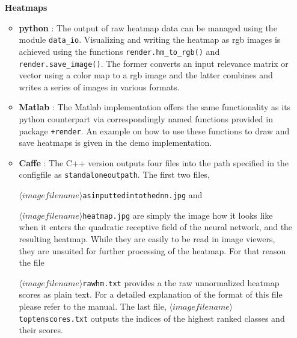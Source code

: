 \documentclass[a4wide]{article}
\begin{document}
\begin{itemize}
\item[{\textbf{Heatmaps}}]
	\begin{itemize}
		\item \textbf{python} : The output of raw heatmap data can be managed using the module \texttt{data\_io}. Visualizing and writing the heatmap as rgb images is achieved using the functions \texttt{render.hm\_to\_rgb()} and \texttt{render.save\_image()}. The former converts an input relevance matrix or vector using a color map to a rgb image and the latter combines and writes a series of images in various formats.
		\item \textbf{Matlab} : The Matlab implementation offers the same functionality as its python counterpart via correspondingly named functions provided in package \texttt{+render}. An example on how to use these functions to draw and save heatmaps is given in the demo implementation.
		\item \textbf{Caffe} : The C++ version outputs four files into the path specified in the configfile as \texttt{standalone\textunderscore outpath}. The first two files, 

\texttt{$\langle imagefilename\rangle$\textunderscore as\textunderscore inputted\textunderscore into\textunderscore the\textunderscore dnn.jpg} and 

\texttt{$\langle imagefilename\rangle$\textunderscore heatmap.jpg} are simply the image how it looks like when it enters the quadratic receptive field of the neural network, and the resulting heatmap. While they are easily to be read in image viewers, they are unsuited for further processing of the heatmap. For that reason the file 

\texttt{$\langle imagefilename\rangle$\textunderscore rawhm.txt} provides a the raw unnormalized heatmap scores as plain text. For a detailed explanation of the format of this file please refer to the manual. The last file, \texttt{$\langle imagefilename\rangle$\textunderscore toptenscores.txt} outputs the indices of the highest ranked classes and their scores.
	

\end{itemize}
\end{itemize}
\end{document}
